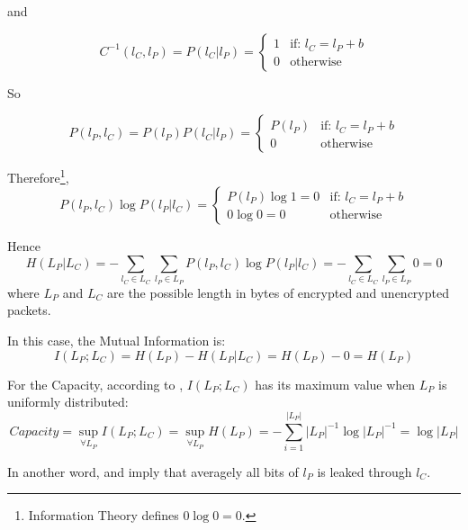 and

\begin{equation}
	C^{-1}(l_{C}, l_{P}) = P(l_{C} | l_{P}) = 
	\begin{cases}
		1 &\text{if: } l_{C} = l_{P} + b \\
		0 &\text{otherwise}
	\end{cases}
\end{equation}

So

\begin{equation}
	P(l_{P} , l_{C}) = P(l_{P}) P(l_{C} | l_{P}) =
	\begin{cases}
		P(l_{P}) &\text{if: } l_{C} = l_{P} + b \\
		0 &\text{otherwise}
	\end{cases}
\end{equation}

Therefore\footnote{Information Theory defines $0\log{0} = 0$.},
\begin{equation}
	P(l_{P} , l_{C}) \log{P(l_{P} | l_{C})} = 
	\begin{cases}
		P(l_{P})\log{1} = 0 &\text{if: } l_{C} = l_{P} + b \\
		0 \log{0} = 0 &\text{otherwise}
	\end{cases}
\end{equation}

Hence
\begin{equation}
	H(L_{P} | L_{C}) = - \sum_{l_{C} \in L_{C}} \sum_{l_{P} \in L_{P}}P(l_{P} , l_{C}) \log{P(l_{P} | l_{C})} = - \sum_{l_{C} \in L_{C}} \sum_{l_{P} \in L_{P}} 0 = 0
\end{equation}
where $L_{P}$ and $L_{C}$ are the possible length in bytes of encrypted and unencrypted packets.

In this case, the Mutual Information is:
\begin{equation} \label{Eq: MI in length}
	I(L_{P};L_{C}) = H(L_{P}) - H(L_{P} | L_{C} ) = H(L_{P}) - 0 = H(L_{P})
\end{equation}

For the Capacity, according to , $I(L_{P};L_{C})$ has its maximum value when $L_{P}$ is uniformly distributed:
\begin{equation} \label{Eq: Cap in length}
	Capacity = \sup_{\forall L_{P}}{I(L_{P};L_{C})} = \sup_{\forall L_{P}}H(L_{P}) = - \sum_{i = 1}^{|L_{P}|}|L_{P}|^{-1}\log{|L_{P}|^{-1}} = \log{|L_{P}|}
\end{equation}

In another word,  and   imply that averagely all bits of $l_{P}$ is leaked through $l_{C}$.

